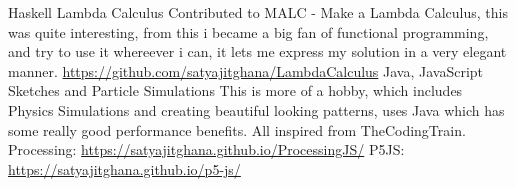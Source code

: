\begin{cventries}
    \cventry
        {Haskell}
        {Lambda Calculus}
        {}
        {}
        {Contributed to MALC - Make a Lambda Calculus, this was quite interesting, from this i became a big fan of functional programming,
        and try to use it whereever i can, it lets me express my solution in a very elegant manner.
        \url{https://github.com/satyajitghana/LambdaCalculus}
        }
    \cventry
        {Java, JavaScript}
        {Sketches and Particle Simulations}
        {}
        {}
        {
        This is more of a hobby, which includes Physics Simulations and creating beautiful looking patterns, uses Java which has some really good performance benefits. All inspired from TheCodingTrain.
        Processing: \url{https://satyajitghana.github.io/ProcessingJS/}
        P5JS: \url{https://satyajitghana.github.io/p5-js/}
        }
\end{cventries}
